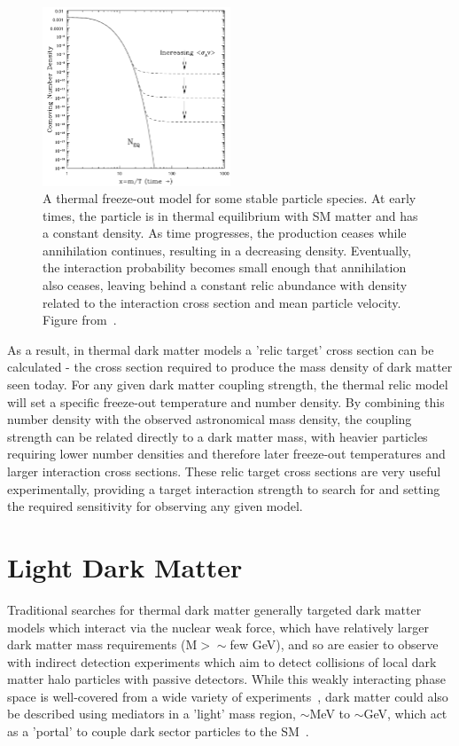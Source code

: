 \begin{figure}
	\centering
	\includegraphics[width=0.5\textwidth]{figures/thermal_relic.png}
	\caption[Thermal Freeze-Out]{A thermal freeze-out model for some stable particle species. At early times, the particle is in thermal equilibrium with SM matter and has a constant density. As time progresses, the production ceases while annihilation continues, resulting in a decreasing density. Eventually, the interaction probability becomes small enough that annihilation also ceases, leaving behind a constant relic abundance with density related to the interaction cross section and mean particle velocity. Figure from~\cite{hooper2009tasi}.}
        \label{fig:freezeout}
\end{figure}

As a result, in thermal dark matter models a 'relic target' cross section can be calculated - the cross section required to produce the mass density of dark matter seen today.
For any given dark matter coupling strength, the thermal relic model will set a specific freeze-out temperature and number density.
By combining this number density with the observed astronomical mass density, the coupling strength can be related directly to a dark matter mass, with heavier particles requiring lower number densities and therefore later freeze-out temperatures and larger interaction cross sections.
These relic target cross sections are very useful experimentally, providing a target interaction strength to search for and setting the required sensitivity for observing any given model.

\section{Light Dark Matter}
Traditional searches for thermal dark matter generally targeted dark matter models which interact via the nuclear weak force, which have relatively larger dark matter mass requirements (M$>\sim$few GeV), and so are easier to observe with indirect detection experiments which aim to detect collisions of local dark matter halo particles with passive detectors.
While this weakly interacting phase space is well-covered from a wide variety of experiments~\cite{Roszkowski_2018}, dark matter could also be described using mediators in a 'light' mass region, $\sim$MeV to $\sim$GeV, which act as a 'portal' to couple dark sector particles to the SM~\cite{darkSectors}.

